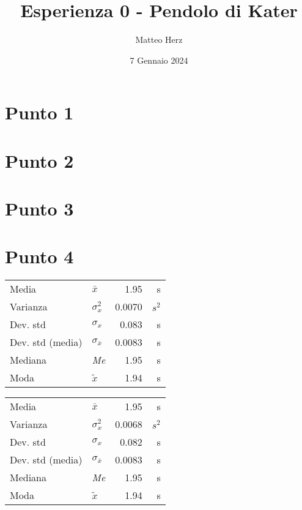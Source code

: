 \documentclass{article}
\title{Esperienza 0 - Pendolo di Kater}
\author{Matteo Herz}
\date{7 Gennaio 2024}
\begin{document}


\newpage

\tableofcontents 

\newpage 
\section{Punto 1}
\section{Punto 2}
\section{Punto 3}
\section{Punto 4}

\hspace{0.6cm}
    \begin{minipage}[c]{0.45\textwidth}
    	\centering 
        \begin{tabular}{llrr}
        	\toprule
            Media & $\bar{x}$ & 1.95 & s \\
            Varianza & $\sigma^2_x$ & 0.0070 & $s^2$ \\
            Dev. std & $\sigma_x$ & 0.083 & s \\
            Dev. std (media) & $\sigma_{\bar{x}}$ & 0.0083 & s \\
            Mediana & \textit{Me} & 1.95 & s \\
            Moda & $\tilde{x}$ & 1.94 & s \\
            \bottomrule 
        \end{tabular}
    \end{minipage}%
    \begin{minipage}[c]{0.45\textwidth}
    	\centering
        \begin{tabular}{llrr}
        	\toprule
            Media & $\bar{x}$ & 1.95 & s \\
            Varianza & $\sigma^2_x$ & 0.0068 & $s^2$ \\
            Dev. std & $\sigma_x$ & 0.082 & s \\
            Dev. std (media) & $\sigma_{\bar{x}}$ & 0.0083 & s \\
            Mediana & \textit{Me} & 1.95 & s \\
            Moda & $\tilde{x}$ & 1.94 & s \\
            \bottomrule
        \end{tabular}
    \end{minipage}
    \vspace{0.4cm}
\end{document}
